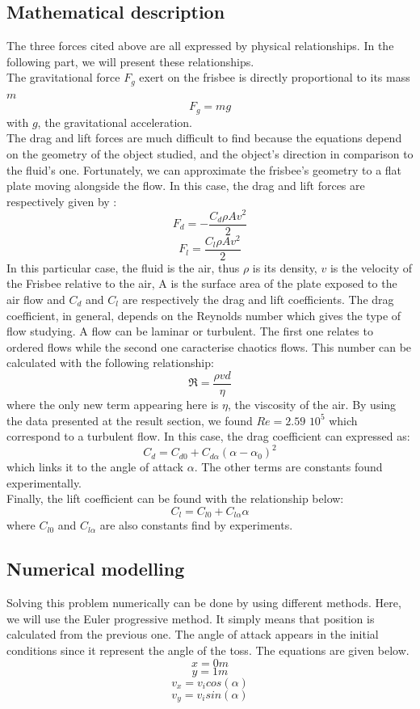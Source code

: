 \documentclass[10pt,a4paper]{report}
\begin{document}
\subsection{Mathematical description}
The three forces cited above are all expressed by physical relationships. In the following part, we will present these relationships.
\\The gravitational force $F_g$ exert on the frisbee is directly proportional to its mass $m$
\[F_g = m g\]
with $g$, the gravitational acceleration.
\\
The drag and lift forces are much difficult to find because the equations depend on the geometry of the object studied, and the object's direction in comparison to the fluid's one. Fortunately, we can approximate the frisbee's geometry to a flat plate moving alongside the flow. In this case, the drag and lift forces are respectively given by :
\[F_d = -\frac{C_d \rho A  v^2}{2}\]
\[F_l = \frac{C_l \rho A  v^2}{2}\]
In this particular case, the fluid is the air, thus $\rho$ is its density, $v$ is the velocity of the Frisbee relative to the air, A is the surface area of the plate exposed to the air flow and $C_d$ and $C_l$ are respectively the drag and lift coefficients.
The drag coefficient, in general, depends on the Reynolds number which gives the type of flow studying. A flow can be laminar or turbulent. The first one relates to ordered flows while the second one caracterise chaotics flows. This number can be calculated with the following relationship:
\[\Re = \frac{\rho v d}{\eta}\]
where the only new term appearing here is $\eta$, the viscosity of the air.
By using the data presented at the result section, we found $Re=2.59$ $10^5$ which correspond to a turbulent flow.
In this case, the drag coefficient can expressed as:
\[C_d = C_{d0} + C_{d\alpha}(\alpha-\alpha_0)^2\]
which links it to the angle of attack $\alpha$. The other terms are constants found experimentally.
\\Finally, the lift coefficient can be found with the relationship below:
\[C_l = C_{l0} + C_{l \alpha} \alpha\]
where $C_{l0}$ and $C_{l\alpha}$ are also constants find by experiments.
\subsection{Numerical modelling}
Solving this problem numerically can be done by using different methods. Here, we will use the Euler progressive method. It simply means that position is calculated from the previous one.
The angle of attack appears in the initial conditions since it represent the angle of the toss. The equations are given below.
\[x = 0 m\]
\[y = 1 m\]
\[v_x = v_i cos(\alpha) \]
\[v_y = v_i sin(\alpha) \] 
\end{document}
